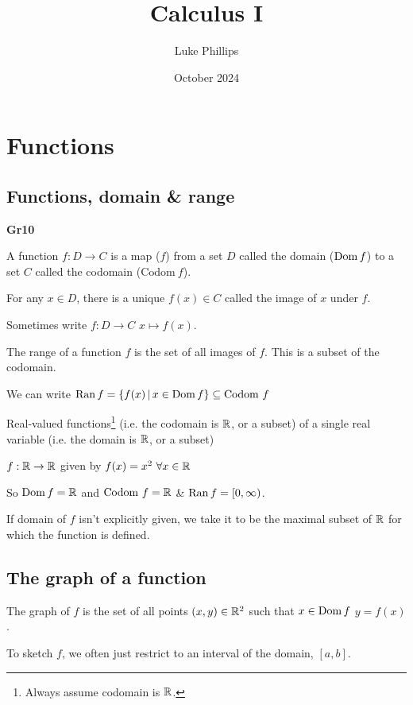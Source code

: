 \documentclass[10pt, a4paper]{article}
\title{Calculus I}
\author{Luke Phillips}
\date{October 2024}
\begin{document}
\maketitle

\newpage

\tableofcontents

\newpage

\section{Functions}

\subsection{Functions, domain \& range}

\textbf{Gr10}

\begin{definition}
    A function $f : D \rightarrow C$ is a map ($f$) from a set $D$ called the domain ($\operatorname{Dom} f$) to a set $C$ called the codomain ($\mathrm{Codom}\ f$).
    
    For any $x \in D$, there is a unique $f(x) \in C$ called the image of $x$ under $f$.
\end{definition}

Sometimes  write $f : D \rightarrow C$ $x \mapsto f(x)$.

\begin{definition}
    The range of a function $f$ is the set of all images of $f$. This is a subset of the codomain.
    
    We can write $\operatorname{Ran} f = \{f(x)\,|\,x \in \operatorname{Dom} f\} \subseteq \mathrm{Codom}\ f$
\end{definition}

Real-valued functions\footnote{Always assume codomain is $\mathbb{R}$.} (i.e. the codomain is $\mathbb{R}$, or a subset) of a single real variable (i.e. the domain is $\mathbb{R}$, or a subset)

\begin{example}
    $f : \mathbb{R} \rightarrow \mathbb{R}$ given by $f(x) = x ^ 2\ \forall x \in \mathbb{R}$

    So $\operatorname{Dom} f = \mathbb{R}$ and $\mathrm{Codom}\ f = \mathbb{R}$ \& $\operatorname{Ran} f = [0, \infty)$.
\end{example}

If domain of $f$ isn't explicitly given, we take it to be the maximal subset of $\mathbb{R}$ for which the function is defined.

\subsection{The graph of a function}
\begin{definition}[Graph]
    The graph of $f$ is the set of all points $(x, y) \in \mathbb{R} ^ 2$ such that $x \in \operatorname{Dom} f$ $y = f(x)$.
\end{definition}
To sketch $f$, we often just restrict to an interval of the domain, $[a, b]$.
\end{document}
